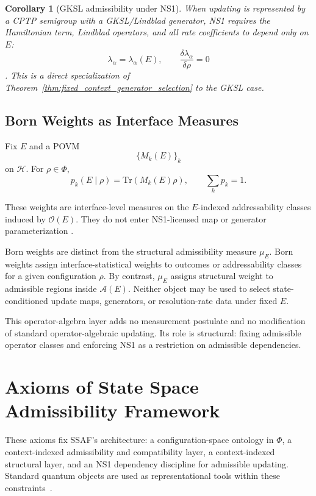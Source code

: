 \documentclass[aps,prx,onecolumn,11pt]{revtex4-2}
\theoremstyle{plain}
\newtheorem{corollary}{Corollary}
\theoremstyle{definition}
\theoremstyle{remark}
\begin{document}
\begin{corollary}[GKSL admissibility under NS1]
\label{cor:NS1_GKSL_admissible}
When updating is represented by a CPTP semigroup with a GKSL/Lindblad
generator, NS1 requires the Hamiltonian term, Lindblad operators, and
all rate coefficients to depend only on \(E\):
\[
\lambda_\alpha=\lambda_\alpha(E),
\qquad
\frac{\delta\lambda_\alpha}{\delta\rho}=0
\]
\cite{Lindblad1976,Gorini1976,Watrous2018}. This is a direct
specialization of
Theorem~\ref{thm:fixed_context_generator_selection} to the GKSL case.
\end{corollary}

\subsection{Born Weights as Interface Measures}
\label{subsec:born_weights_interface}

Fix \(E\) and a POVM
\[
\{M_k(E)\}_k
\]
on \(\mathcal{H}\). For \(\rho\in\Phi\),
\[
p_k(E\mid\rho)
=
\mathrm{Tr}(M_k(E)\rho),
\qquad
\sum_k p_k=1.
\]

These weights are interface-level measures on the \(E\)-indexed
addressability classes induced by \(\mathcal{O}(E)\). They do not enter
NS1-licensed map or generator parameterization
\cite{Born1926,Gleason1957,Deutsch1999,NielsenChuang2010,Watrous2018}.

Born weights are distinct from the structural admissibility measure
\(\mu_E\). Born weights assign interface-statistical weights to
outcomes or addressability classes for a given configuration \(\rho\).
By contrast, \(\mu_E\) assigns structural weight to admissible regions
inside \(\mathcal A(E)\). Neither object may be used to select
state-conditioned update maps, generators, or resolution-rate data under
fixed \(E\).

This operator-algebra layer adds no measurement postulate and no
modification of standard operator-algebraic updating. Its role is
structural: fixing admissible operator classes and enforcing NS1 as a
restriction on admissible dependencies.

\clearpage

\section{Axioms of State Space Admissibility Framework}
\label{sec:axioms}

These axioms fix SSAF's architecture: a configuration-space ontology in
\(\Phi\), a context-indexed admissibility and compatibility layer, a
context-indexed structural layer, and an NS1 dependency discipline for
admissible updating. Standard quantum objects are used as
representational tools within these constraints~\cite{Watrous2018,NielsenChuang2010}.
\end{document}
